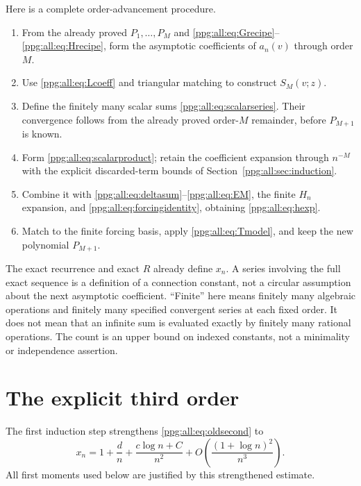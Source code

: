 \documentclass[11pt,letterpaper]{article}
\theoremstyle{remark}\newtheorem{remark}[theorem]{Remark}
\numberwithin{equation}{section}
\begin{document}
Here is a complete order-advancement procedure.
\begin{enumerate}
\item From the already proved $P_1,\ldots,P_M$ and \eqref{ppg:all:eq:Grecipe}--\eqref{ppg:all:eq:Hrecipe}, form the asymptotic coefficients of $a_n(v)$ through order $M$.
\item Use \eqref{ppg:all:eq:Lcoeff} and triangular matching to construct $S_M(v;z)$.
\item Define the finitely many scalar sums \eqref{ppg:all:eq:scalarseries}. Their convergence follows from the already proved order-$M$ remainder, before $P_{M+1}$ is known.
\item Form \eqref{ppg:all:eq:scalarproduct}; retain the coefficient expansion through $n^{-M}$ with the explicit discarded-term bounds of Section~\ref{ppg:all:sec:induction}.
\item Combine it with \eqref{ppg:all:eq:deltasum}--\eqref{ppg:all:eq:EM}, the finite $H_n$ expansion, and \eqref{ppg:all:eq:forcingidentity}, obtaining \eqref{ppg:all:eq:hexp}.
\item Match to the finite forcing basis, apply \eqref{ppg:all:eq:Tmodel}, and keep the new polynomial $P_{M+1}$.
\end{enumerate}
The exact recurrence and exact $R$ already define $x_n$. A series involving the full exact sequence is a definition of a connection constant, not a circular assumption about the next asymptotic coefficient. ``Finite'' here means finitely many algebraic operations and finitely many specified convergent series at each fixed order. It does not mean that an infinite sum is evaluated exactly by finitely many rational operations. The count is an upper bound on indexed constants, not a minimality or independence assertion.

\section{The explicit third order}\label{ppg:all:sec:third}
The first induction step strengthens \eqref{ppg:all:eq:oldsecond} to
\begin{equation}\label{ppg:all:eq:strongsecond}
 x_n=1+\frac d n+\frac{c\log n+C}{n^2}
       +O\!\left(\frac{(1+\log n)^2}{n^3}\right).
\end{equation}
All first moments used below are justified by this strengthened estimate.
\end{document}
